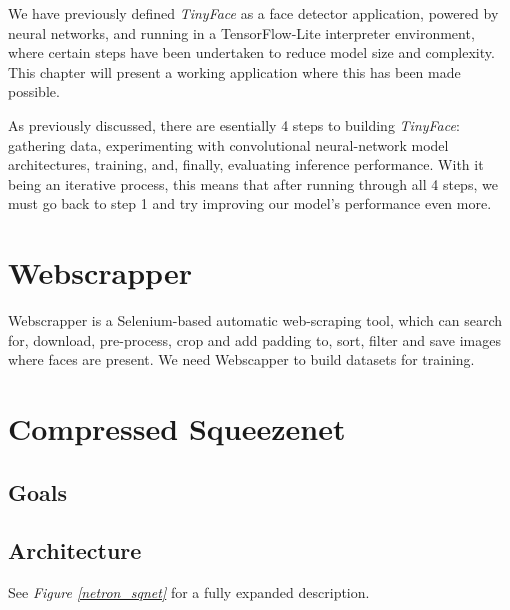 We have previously defined \textit{TinyFace} as a face detector application, powered by neural networks, and running in a TensorFlow-Lite interpreter environment, where certain steps have been undertaken to reduce model size and complexity. This chapter will present a working application where this has been made possible. \par
As previously discussed, there are esentially 4 steps to building \textit{TinyFace}: gathering data, experimenting with convolutional neural-network model architectures, training, and, finally, evaluating inference performance. With it being an iterative process, this means that after running through all 4 steps, we must go back to step 1 and try improving our model's performance even more. \par
\section{Webscrapper}
Webscrapper is a Selenium-based automatic web-scraping tool, which can search for, download, pre-process, crop and add padding to, sort, filter and save images where faces are present. We need Webscapper to build datasets for training.
\section{Compressed Squeezenet}
\subsection{Goals}
\subsection{Architecture}
See \textit{Figure \ref{netron_sqnet}} for a fully expanded description.

